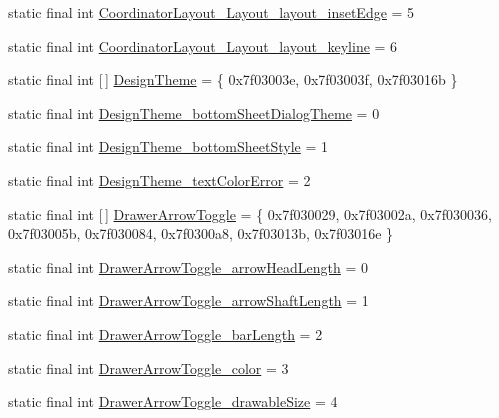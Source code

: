 \begin{DoxyCompactItemize}
static final int \mbox{\hyperlink{classandroid_1_1support_1_1design_1_1R_1_1styleable_ac5a3cdc8957c70cc66e0e7eb162a4a54}{Coordinator\+Layout\+\_\+\+Layout\+\_\+layout\+\_\+inset\+Edge}} = 5
\item 
static final int \mbox{\hyperlink{classandroid_1_1support_1_1design_1_1R_1_1styleable_adc67bafc5ae56db3abd6ec5a003f0b9a}{Coordinator\+Layout\+\_\+\+Layout\+\_\+layout\+\_\+keyline}} = 6
\item 
static final int \mbox{[}$\,$\mbox{]} \mbox{\hyperlink{classandroid_1_1support_1_1design_1_1R_1_1styleable_a340277a41103d3ce86cf1861cc50c1c9}{Design\+Theme}} = \{ 0x7f03003e, 0x7f03003f, 0x7f03016b \}
\item 
static final int \mbox{\hyperlink{classandroid_1_1support_1_1design_1_1R_1_1styleable_a62df833170339d86a1441aecd49670c2}{Design\+Theme\+\_\+bottom\+Sheet\+Dialog\+Theme}} = 0
\item 
static final int \mbox{\hyperlink{classandroid_1_1support_1_1design_1_1R_1_1styleable_afe1b6c829f174633cfb6f1e6885be833}{Design\+Theme\+\_\+bottom\+Sheet\+Style}} = 1
\item 
static final int \mbox{\hyperlink{classandroid_1_1support_1_1design_1_1R_1_1styleable_a02c6796a896b6c3f54682cd0a906312f}{Design\+Theme\+\_\+text\+Color\+Error}} = 2
\item 
static final int \mbox{[}$\,$\mbox{]} \mbox{\hyperlink{classandroid_1_1support_1_1design_1_1R_1_1styleable_a559d22c78738e5161420dc4b41689c1b}{Drawer\+Arrow\+Toggle}} = \{ 0x7f030029, 0x7f03002a, 0x7f030036, 0x7f03005b, 0x7f030084, 0x7f0300a8, 0x7f03013b, 0x7f03016e \}
\item 
static final int \mbox{\hyperlink{classandroid_1_1support_1_1design_1_1R_1_1styleable_a24ad965a1251127297d0ff2c9e45ee06}{Drawer\+Arrow\+Toggle\+\_\+arrow\+Head\+Length}} = 0
\item 
static final int \mbox{\hyperlink{classandroid_1_1support_1_1design_1_1R_1_1styleable_a4e429a1922b15c56d792545c996d45d1}{Drawer\+Arrow\+Toggle\+\_\+arrow\+Shaft\+Length}} = 1
\item 
static final int \mbox{\hyperlink{classandroid_1_1support_1_1design_1_1R_1_1styleable_a54b35adfa7a299b34c33e6937cf76daf}{Drawer\+Arrow\+Toggle\+\_\+bar\+Length}} = 2
\item 
static final int \mbox{\hyperlink{classandroid_1_1support_1_1design_1_1R_1_1styleable_ac4d5211c86d092042a0345825deae18b}{Drawer\+Arrow\+Toggle\+\_\+color}} = 3
\item 
static final int \mbox{\hyperlink{classandroid_1_1support_1_1design_1_1R_1_1styleable_a0cf8966074e0de6dde7fa5cfec03d99e}{Drawer\+Arrow\+Toggle\+\_\+drawable\+Size}} = 4

\end{DoxyCompactItemize}
